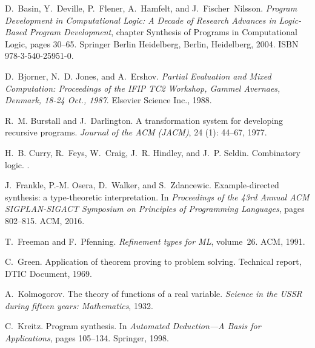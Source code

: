 \documentclass[preprint, 11pt]{sigplanconf}
\begin{document}
\begin{thebibliography}{14}
\softraggedright

D.~Basin, Y.~Deville, P.~Flener, A.~Hamfelt, and J.~Fischer~Nilsson.
\newblock \emph{Program Development in Computational Logic: A Decade of
  Research Advances in Logic-Based Program Development}, chapter Synthesis of
  Programs in Computational Logic, pages 30--65.
\newblock Springer Berlin Heidelberg, Berlin, Heidelberg, 2004.
\newblock ISBN 978-3-540-25951-0.

D.~Bjorner, N.~D. Jones, and A.~Ershov.
\newblock \emph{Partial Evaluation and Mixed Computation: Proceedings of the
  IFIP TC2 Workshop, Gammel Avernaes, Denmark, 18-24 Oct., 1987}.
\newblock Elsevier Science Inc., 1988.

R.~M. Burstall and J.~Darlington.
\newblock A transformation system for developing recursive programs.
\newblock \emph{Journal of the ACM (JACM)}, 24 (1): 44--67,
  1977.

H.~B. Curry, R.~Feys, W.~Craig, J.~R. Hindley, and J.~P. Seldin.
\newblock Combinatory logic.
.

J.~Frankle, P.-M. Osera, D.~Walker, and S.~Zdancewic.
\newblock Example-directed synthesis: a type-theoretic interpretation.
\newblock In \emph{Proceedings of the 43rd Annual ACM SIGPLAN-SIGACT Symposium
  on Principles of Programming Languages}, pages 802--815. ACM, 2016.

T.~Freeman and F.~Pfenning.
\newblock \emph{Refinement types for ML}, volume~26.
\newblock ACM, 1991.

C.~Green.
\newblock Application of theorem proving to problem solving.
\newblock Technical report, DTIC Document, 1969.

A.~Kolmogorov.
\newblock The theory of functions of a real variable.
\newblock \emph{Science in the USSR during fifteen years: Mathematics}, 1932.

C.~Kreitz.
\newblock Program synthesis.
\newblock In \emph{Automated Deduction—A Basis for Applications}, pages
  105--134. Springer, 1998.


\end{thebibliography}
\end{document}

